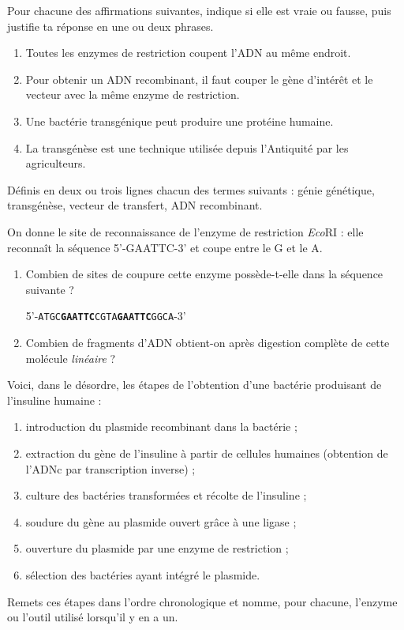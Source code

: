 \documentclass[11pt]{article}
\newcommand{\cle}[1]{{\popxbold\color{popdark}#1}}
\newcounter{popsec}
\newcounter{popsub}
\newcommand{\courssub}[1]{%
  \stepcounter{popsub}%
  \par\vspace{9pt}\noindent{\popxbold\fontsize{11.5}{13}\selectfont\color{popink}{\color{poporange}\thepopsec.\thepopsub}\hspace{6pt}#1}\par\nopagebreak\vspace{4pt}
}
\begin{document}
\begin{exercice}
Pour chacune des affirmations suivantes, indique si elle est vraie ou fausse, puis justifie ta réponse en une ou deux phrases.
\begin{enumerate}
\item Toutes les enzymes de restriction coupent l'ADN au même endroit.
\item Pour obtenir un ADN recombinant, il faut couper le gène d'intérêt et le vecteur avec la même enzyme de restriction.
\item Une bactérie transgénique peut produire une protéine humaine.
\item La transgénèse est une technique utilisée depuis l'Antiquité par les agriculteurs.
\end{enumerate}
\end{exercice}

\begin{exercice}[Définitions]
Définis en deux ou trois lignes chacun des termes suivants : \cle{génie génétique}, \cle{transgénèse}, \cle{vecteur de transfert}, \cle{ADN recombinant}.
\end{exercice}

\begin{exercice}
On donne le site de reconnaissance de l'enzyme de restriction \emph{Eco}RI : elle reconnaît la séquence 5'-GAATTC-3' et coupe entre le G et le A.
\begin{enumerate}
\item Combien de sites de coupure cette enzyme possède-t-elle dans la séquence suivante ?

5'-\texttt{ATGC\textbf{GAATTC}CGTA\textbf{GAATTC}GGCA}-3'
\item Combien de fragments d'ADN obtient-on après digestion complète de cette molécule \emph{linéaire} ?
\end{enumerate}
\end{exercice}

\courssub{Je m'entraîne}

\begin{exercice}
Voici, dans le désordre, les étapes de l'obtention d'une bactérie produisant de l'insuline humaine :
\begin{enumerate}
\item[a.] introduction du plasmide recombinant dans la bactérie ;
\item[b.] extraction du gène de l'insuline à partir de cellules humaines (obtention de l'ADNc par transcription inverse) ;
\item[c.] culture des bactéries transformées et récolte de l'insuline ;
\item[d.] soudure du gène au plasmide ouvert grâce à une ligase ;
\item[e.] ouverture du plasmide par une enzyme de restriction ;
\item[f.] sélection des bactéries ayant intégré le plasmide.
\end{enumerate}
Remets ces étapes dans l'ordre chronologique et nomme, pour chacune, l'enzyme ou l'outil utilisé lorsqu'il y en a un.
\end{exercice}
\end{document}

